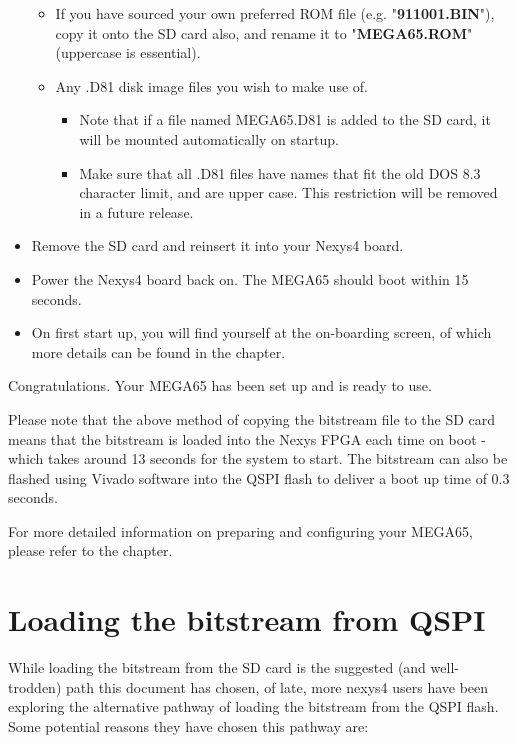 \begin{itemize}
\begin{itemize}
    \item{If you have sourced your own preferred ROM file} (e.g. "\textbf{911001.BIN}"), copy it onto the SD card also, and rename it to "\textbf{MEGA65.ROM}" (uppercase is essential).
    \item{Any .D81 disk image files} you wish to make use of.
      \begin{itemize}
        \item Note that if a file named MEGA65.D81 is added to the SD card, it will be mounted automatically on startup.
        \item Make sure that all .D81 files have names that fit the old DOS 8.3 character limit, and are upper case.  This restriction will be removed in a future release.
      \end{itemize}
  \end{itemize}
\item{Remove the SD card} and reinsert it into your Nexys4 board.
\item{Power the Nexys4} board back on.  The MEGA65 should boot within 15 seconds.
\item On first start up, you will find yourself at the on-boarding screen, of which more details can be found in the  chapter.

\end{itemize}

Congratulations. Your MEGA65 has been set up and is ready to use.

Please note that the above method of copying the bitstream file to the SD card means that the bitstream is loaded into the Nexys FPGA each time on boot - which takes around 13 seconds for the system to start. The bitstream can also be flashed using Vivado software into the QSPI flash to deliver a boot up time of 0.3 seconds. 

For more detailed information on preparing and configuring your MEGA65, please refer to the  chapter. 

\section{Loading the bitstream from QSPI}

While loading the bitstream from the SD card is the suggested (and well-trodden) path this document has chosen, of late, more nexys4 users have been exploring the alternative pathway of loading the bitstream from the QSPI flash. Some potential reasons they have chosen this pathway are:

